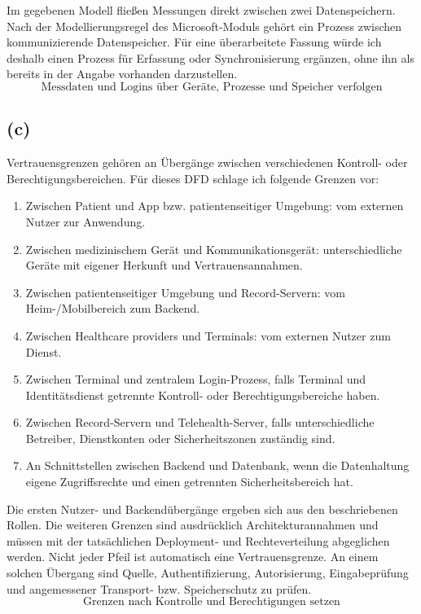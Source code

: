 \documentclass[a4paper,11pt]{article}
\newif\ifexplain
\newcommand{\teil}[1]{\subsection*{(#1)}}
\newcommand{\explain}[1]{\ifexplain\begin{erklbox}#1\end{erklbox}\fi}
\newcommand{\ergebnis}[1]{\[\boxed{\text{#1}}\]}
\begin{document}
Im gegebenen Modell fließen Messungen direkt zwischen zwei Datenspeichern.
Nach der Modellierungsregel des Microsoft-Moduls gehört ein Prozess zwischen kommunizierende Datenspeicher.
Für eine überarbeitete Fassung würde ich deshalb einen Prozess für Erfassung oder Synchronisierung ergänzen,
ohne ihn als bereits in der Angabe vorhanden darzustellen.
\ergebnis{Messdaten und Logins über Geräte, Prozesse und Speicher verfolgen}
\explain{Wir lesen die Symbole vor den Namen. Ein Element mit ``devices'' im Namen ist im Blatt als
Speicher gezeichnet. Außerdem darf ein fachlich sinnvoller Ablauf nicht mit einer Behauptung
verwechselt werden, dass eine bestimmte Schutzmaßnahme schon implementiert ist.}
\teil{c}
Vertrauensgrenzen gehören an Übergänge zwischen verschiedenen Kontroll- oder Berechtigungsbereichen.
Für dieses DFD schlage ich folgende Grenzen vor:
\begin{enumerate}[nosep]
\item Zwischen Patient und App bzw. patientenseitiger Umgebung: vom externen Nutzer zur Anwendung.
\item Zwischen medizinischem Gerät und Kommunikationsgerät: unterschiedliche Geräte mit eigener Herkunft und Vertrauensannahmen.
\item Zwischen patientenseitiger Umgebung und Record-Servern: vom Heim-/Mobilbereich zum Backend.
\item Zwischen Healthcare providers und Terminals: vom externen Nutzer zum Dienst.
\item Zwischen Terminal und zentralem Login-Prozess, falls Terminal und Identitätsdienst getrennte Kontroll- oder Berechtigungsbereiche haben.
\item Zwischen Record-Servern und Telehealth-Server, falls unterschiedliche Betreiber, Dienstkonten oder Sicherheitszonen zuständig sind.
\item An Schnittstellen zwischen Backend und Datenbank, wenn die Datenhaltung eigene Zugriffsrechte und einen getrennten Sicherheitsbereich hat.
\end{enumerate}
Die ersten Nutzer- und Backendübergänge ergeben sich aus den beschriebenen Rollen.
Die weiteren Grenzen sind ausdrücklich Architekturannahmen und müssen mit der tatsächlichen Deployment- und Rechteverteilung abgeglichen werden.
Nicht jeder Pfeil ist automatisch eine Vertrauensgrenze.
An einem solchen Übergang sind Quelle, Authentifizierung, Autorisierung, Eingabeprüfung und angemessener Transport- bzw. Speicherschutz zu prüfen.
\ergebnis{Grenzen nach Kontrolle und Berechtigungen setzen}
\explain{Eine Vertrauensgrenze ist kein zusätzliches Kabel. Sie markiert eine Änderung dessen,
worauf wir uns verlassen dürfen. Bei einer externen Anfrage reicht daher nicht ``die Daten sind angekommen'';
der empfangende Prozess muss auch prüfen, wer sie geschickt hat und was diese Person tun darf.}
\end{document}

